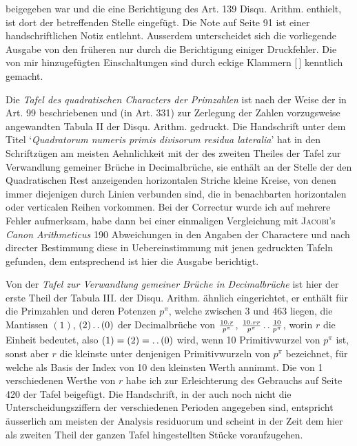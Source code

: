 beigegeben war und die eine Berichtigung des Art. 139 Disqu. Arithm. enthielt, ist dort der betreffenden Stelle eingefügt. Die Note auf Seite 91 ist einer handschriftlichen Notiz entlehnt. Ausserdem unterscheidet sich die vorliegende Ausgabe von den früheren nur durch die Berichtigung einiger Druckfehler. Die von mir hinzugefügten Einschaltungen sind durch eckige Klammern [\,] kenntlich gemacht.
\par Die \textit{Tafel des quadratischen Characters der Primzahlen} ist nach der Weise der in Art. 99 beschriebenen und (in Art. 331) zur Zerlegung der Zahlen vorzugsweise angewandten Tabula II der Disqu. Arithm. gedruckt. Die Handschrift unter dem Titel ‘\textit{Quadratorum numeris primis divisorum residua lateralia}’ hat in den Schriftzügen am meisten Aehnlichkeit mit der des zweiten Theiles der Tafel zur Verwandlung gemeiner Brüche in Decimalbrüche, sie enthält an der Stelle der den Quadratischen Rest anzeigenden horizontalen Striche kleine Kreise, von denen immer diejenigen durch Linien verbunden sind, die in benachbarten horizontalen oder verticalen Reihen vorkommen. Bei der Correctur wurde ich auf mehrere Fehler aufmerksam, habe dann bei einer einmaligen Vergleichung mit \textsc{Jacobi}’s \textit{Canon Arithmeticus} 190 Abweichungen in den Angaben der Charactere und nach directer Bestimmung diese in Uebereinstimmung mit jenen gedruckten Tafeln gefunden, dem entsprechend ist hier die Ausgabe berichtigt.
\par Von der \textit{Tafel zur Verwandlung gemeiner Brüche in Decimalbrüche} ist hier der erste Theil der Tabula III. der Disqu. Arithm. ähnlich eingerichtet, er enthält für die Primzahlen und deren Potenzen $p^\pi$, welche zwischen 3 und 463 liegen, die Mantissen $(1)$, $(2)\mathinner{.\,.}(0)$ der Decimalbrüche von $\frac{10\mathbin{.} r}{p^\pi}$, $\frac{10\mathbin{.} rr}{p^\pi}\mathinner{.\,.}\frac{10}{p^\pi}$, worin $r$ die Einheit bedeutet, also $(1)=(2)=\mathinner{.\,.}(0)$ wird, wenn 10 Primitivwurzel von $p^\pi$ ist, sonst aber $r$ die kleinste unter denjenigen Primitivwurzeln von $p^\pi$ bezeichnet, für welche als Basis der Index von 10 den kleinsten Werth annimmt. Die von 1 verschiedenen Werthe von $r$ habe ich zur Erleichterung des Gebrauchs auf Seite 420 der Tafel beigefügt. Die Handschrift, in der auch noch nicht die Unterscheidungsziffern der verschiedenen Perioden angegeben sind, entspricht äusserlich am meisten der Analysis residuorum und scheint in der Zeit dem hier als zweiten Theil der ganzen Tafel hingestellten Stücke voraufzugehen.
